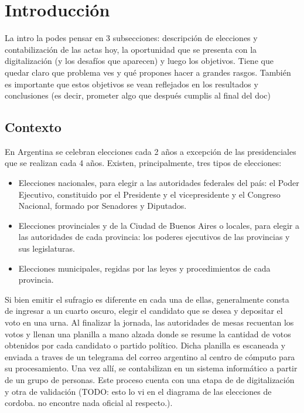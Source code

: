 \chapter{Introducción}

\label{Chapter1}

La intro la podes pensar en 3 subsecciones: descripción de elecciones y contabilización de las actas hoy, la
oportunidad que se presenta con la digitalización (y los desafíos que aparecen) y luego los objetivos. Tiene que quedar
claro que problema ves y qué propones hacer a grandes rasgos. También es importante que estos objetivos se vean
reflejados en los resultados y conclusiones (es decir, prometer algo que después cumplis al final del doc)

\section{Contexto}

En Argentina se celebran elecciones cada 2 años a excepción de las presidenciales que se realizan cada 4 años. Existen,
principalmente, tres tipos de elecciones:

\begin{itemize}
    \item Elecciones nacionales, para elegir a las autoridades federales del país: el Poder Ejecutivo, constituido por el
          Presidente y el vicepresidente y el Congreso Nacional, formado por Senadores y Diputados.
    \item Elecciones provinciales y de la Ciudad de Buenos Aires o locales, para elegir a las autoridades de cada provincia: los
          poderes ejecutivos de las provincias y sus legislaturas.
    \item Elecciones municipales, regidas por las leyes y procedimientos de cada provincia.
\end{itemize}

Si bien emitir el sufragio es diferente en cada una de ellas, generalmente consta de ingresar a un cuarto oscuro,
elegir el candidato que se desea y depositar el voto en una urna. Al finalizar la jornada, las autoridades de mesas
recuentan los votos y llenan una planilla a mano alzada donde se resume la cantidad de votos obtenidos por cada
candidato o partido político. Dicha planilla es escaneada y enviada a traves de un telegrama del correo argentino al
centro de cómputo para su procesamiento. Una vez allí, se contabilizan en un sistema informático a partir de un grupo
de personas. Este proceso cuenta con una etapa de de digitalización y otra de validación (TODO: esto lo vi en el
diagrama de las elecciones de cordoba. no encontre nada oficial al respecto.).

